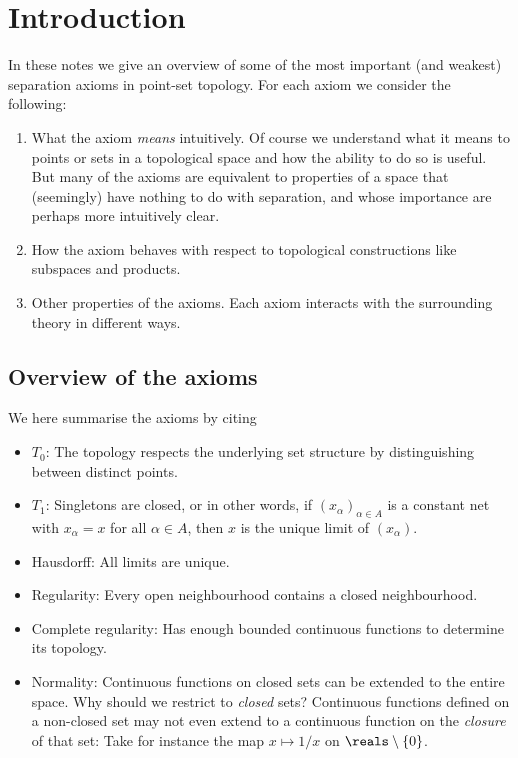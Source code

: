 \documentclass[article, a4paper, 11pt, oneside]{memoir}
\title{\doctitle}
\author{\docauthor}
\numberwithin{equation}{chapter}
\begin{document}
\maketitle

\chapter{Introduction}

In these notes we give an overview of some of the most important (and weakest) separation axioms in point-set topology. For each axiom we consider the following:

\begin{enumerate}
    \item What the axiom \emph{means} intuitively. Of course we understand what it means to  points or sets in a topological space and how the ability to do so is useful. But many of the axioms are equivalent to properties of a space that (seemingly) have nothing to do with separation, and whose importance are perhaps more intuitively clear.

    \item How the axiom behaves with respect to topological constructions like subspaces and products.
    
    \item Other properties of the axioms. Each axiom interacts with the surrounding theory in different ways.
\end{enumerate}


\section{Overview of the axioms}

We here summarise the axioms by citing

\begin{itemize}
    \item $T_0$: The topology respects the underlying set structure by distinguishing between distinct points.
    
    \item $T_1$: Singletons are closed, or in other words, if $(x_\alpha)_{\alpha \in A}$ is a constant net with $x_\alpha = x$ for all $\alpha \in A$, then $x$ is the unique limit of $(x_\alpha)$.
    
    \item Hausdorff: All limits are unique.
    
    \item Regularity: Every open neighbourhood contains a closed neighbourhood.
    
    \item Complete regularity: Has enough bounded continuous functions to determine its topology.
    
    \item Normality: Continuous functions on closed sets can be extended to the entire space. Why should we restrict to \emph{closed} sets? Continuous functions defined on a non-closed set may not even extend to a continuous function on the \emph{closure} of that set: Take for instance the map $x \mapsto 1/x$ on $\reals \setminus \{0\}$.
\end{itemize}
\end{document}
